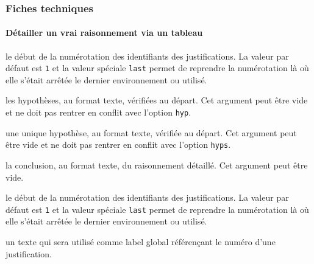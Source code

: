 \documentclass[12pt,a4paper]{article}
\begin{document}


\subsubsection{Fiches techniques}

\paragraph{Détailler un \og vrai \fg{} raisonnement via un tableau}


 le début de la numérotation des identifiants des justifications.
              La valeur par défaut est \verb+1+ et la valeur spéciale \verb+last+ permet de reprendre la numérotation là où elle s'était arrêtée le dernier environnement  ou  utilisé.

 les hypothèses, au format texte, vérifiées au départ.
             Cet argument peut être vide et ne doit pas rentrer en conflit avec l'option \verb+hyp+.

 une unique hypothèse, au format texte, vérifiée au départ.
            Cet argument peut être vide et ne doit pas rentrer en conflit avec l'option \verb+hyps+.

 la conclusion, au format texte, du raisonnement détaillé.
            Cet argument peut être vide.


\separation



 le début de la numérotation des identifiants des justifications.
              La valeur par défaut est \verb+1+ et la valeur spéciale \verb+last+ permet de reprendre la numérotation là où elle s'était arrêtée le dernier environnement  ou  utilisé.


\separation



\IDoption{} un texte qui sera utilisé comme label global référençant le numéro d'une justification.
\end{document}
